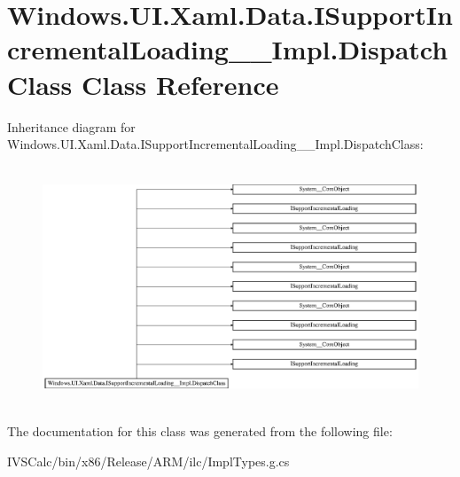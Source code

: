 \hypertarget{class_windows_1_1_u_i_1_1_xaml_1_1_data_1_1_i_support_incremental_loading_____impl_1_1_dispatch_class}{}\section{Windows.\+U\+I.\+Xaml.\+Data.\+I\+Support\+Incremental\+Loading\+\_\+\+\_\+\+Impl.\+Dispatch\+Class Class Reference}
\label{class_windows_1_1_u_i_1_1_xaml_1_1_data_1_1_i_support_incremental_loading_____impl_1_1_dispatch_class}
Inheritance diagram for Windows.\+U\+I.\+Xaml.\+Data.\+I\+Support\+Incremental\+Loading\+\_\+\+\_\+\+Impl.\+Dispatch\+Class\+:\begin{figure}[H]
\begin{center}
\leavevmode
\includegraphics[height=7.196262cm]{class_windows_1_1_u_i_1_1_xaml_1_1_data_1_1_i_support_incremental_loading_____impl_1_1_dispatch_class}
\end{center}
\end{figure}


The documentation for this class was generated from the following file\+:\begin{DoxyCompactItemize}
\item 
I\+V\+S\+Calc/bin/x86/\+Release/\+A\+R\+M/ilc/Impl\+Types.\+g.\+cs\end{DoxyCompactItemize}
